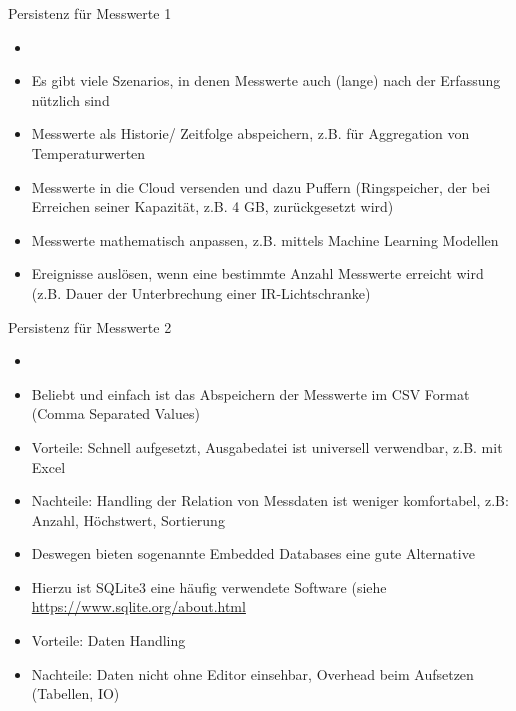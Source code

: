 \begin{frame}{Persistenz für Messwerte 1}
    \begin{itemize}
        \setlength{\itemindent}{1.9in}
        \item [\textbf{Warum Messwerte speichern? }]
    \end{itemize}

    \begin{itemize}
        \item Es gibt viele Szenarios, in denen Messwerte auch (lange) nach der Erfassung nützlich sind
        \item Messwerte als Historie/ Zeitfolge abspeichern, z.B. für Aggregation von Temperaturwerten
        \item Messwerte in die Cloud versenden und dazu Puffern (Ringspeicher, der bei Erreichen seiner Kapazität, z.B. 4 GB, zurückgesetzt wird)
        \item Messwerte mathematisch anpassen, z.B. mittels Machine Learning Modellen
        \item Ereignisse auslösen, wenn eine bestimmte Anzahl Messwerte erreicht wird (z.B. Dauer der Unterbrechung einer IR-Lichtschranke)
     \end{itemize}
\end{frame}


\begin{frame}{Persistenz für Messwerte 2}
    \begin{itemize}
        \setlength{\itemindent}{1.9in}
        \item [\textbf{Welcher Möglichkeiten gibt es? }]
    \end{itemize}

    \begin{itemize}
        \item Beliebt und einfach ist das Abspeichern der Messwerte im CSV Format (Comma Separated Values)
        \item Vorteile: Schnell aufgesetzt, Ausgabedatei ist universell verwendbar, z.B. mit Excel
        \item Nachteile: Handling der Relation von Messdaten ist weniger komfortabel, z.B:  Anzahl, Höchstwert, Sortierung
        \item Deswegen bieten sogenannte Embedded Databases eine gute Alternative
        \item Hierzu ist SQLite3 eine häufig verwendete Software (siehe \url{https://www.sqlite.org/about.html}
        \item Vorteile: Daten Handling
        \item Nachteile: Daten nicht ohne Editor einsehbar, Overhead beim Aufsetzen (Tabellen, IO)
     \end{itemize}
\end{frame}

